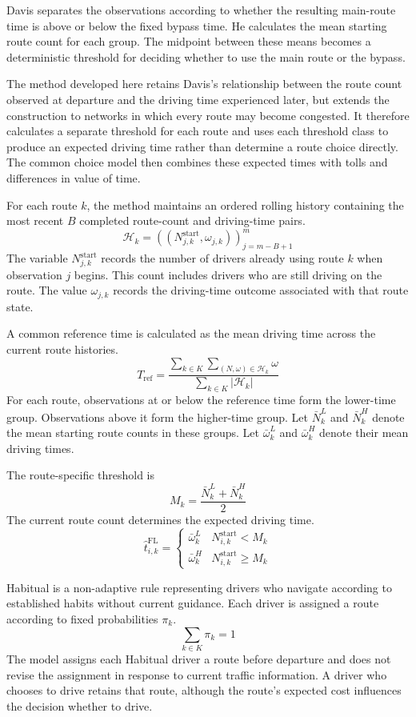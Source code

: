 \documentclass{article}
\begin{document}
Davis separates the observations according to whether the resulting main-route time is above or below the fixed bypass time. He calculates the mean starting route count for each group. The midpoint between these means becomes a deterministic threshold for deciding whether to use the main route or the bypass.

The method developed here retains Davis's relationship between the route count observed at departure and the driving time experienced later, but extends the construction to networks in which every route may become congested. It therefore calculates a separate threshold for each route and uses each threshold class to produce an expected driving time rather than determine a route choice directly. The common choice model then combines these expected times with tolls and differences in value of time.

For each route $k$, the method maintains an ordered rolling history containing the most recent $B$ completed route-count and driving-time pairs.
\[
\mathcal H_k
=
\left(
\left(
N_{j,k}^{\mathrm{start}},
\omega_{j,k}
\right)
\right)_{j=m-B+1}^{m}
\]
The variable $N_{j,k}^{\mathrm{start}}$ records the number of drivers already using route $k$ when observation $j$ begins. This count includes drivers who are still driving on the route. The value $\omega_{j,k}$ records the driving-time outcome associated with that route state.

A common reference time is calculated as the mean driving time across the current route histories.
\[
T_{\mathrm{ref}}
=
\frac{
\displaystyle
\sum_{k\in K}
\sum_{(N,\omega)\in\mathcal H_k}
\omega
}{
\displaystyle
\sum_{k\in K}
|\mathcal H_k|
}
\]
For each route, observations at or below the reference time form the lower-time group. Observations above it form the higher-time group. Let $\bar N_k^L$ and $\bar N_k^H$ denote the mean starting route counts in these groups. Let $\bar\omega_k^L$ and $\bar\omega_k^H$ denote their mean driving times.

The route-specific threshold is
\[
M_k
=
\frac{
\bar N_k^L+\bar N_k^H
}{2}
\]
The current route count determines the expected driving time.
\[
\hat t_{i,k}^{\mathrm{FL}}
=
\begin{cases}
\bar\omega_k^L
&
N_{i,k}^{\mathrm{start}}<M_k
\\
\bar\omega_k^H
&
N_{i,k}^{\mathrm{start}}\geq M_k
\end{cases}
\]

Habitual is a non-adaptive rule representing drivers who navigate according to established habits without current guidance. Each driver is assigned a route according to fixed probabilities $\pi_k$.
\[
\sum_{k\in K}\pi_k=1
\]
The model assigns each Habitual driver a route before departure and does not revise the assignment in response to current traffic information. A driver who chooses to drive retains that route, although the route's expected cost influences the decision whether to drive.
\end{document}
